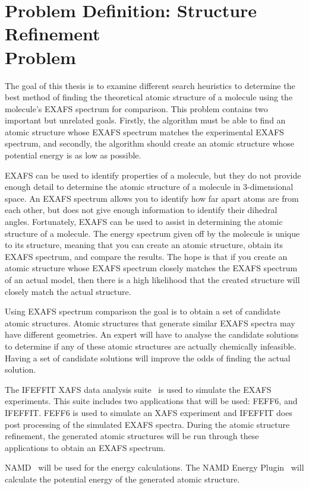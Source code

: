 \section[Problem Definition: Structure Refinement Problem]{Problem Definition: Structure Refinement\\ Problem}
\label{sec:problem-definition}

The goal of this thesis is to examine different search heuristics to determine the best method of finding the theoretical atomic structure of a molecule using the molecule's EXAFS spectrum for comparison. This problem contains two important but unrelated goals. Firstly, the algorithm must be able to find an atomic structure whose EXAFS spectrum matches the experimental EXAFS spectrum, and secondly, the algorithm should create an atomic structure whose potential energy is as low as possible.

EXAFS can be used to identify properties of a molecule, but they do not provide enough detail to determine the atomic structure of a molecule in 3-dimensional space. An EXAFS spectrum allows you to identify how far apart atoms are from each other, but does not give enough information to identify their dihedral angles. Fortunately, EXAFS can be used to assist in determining the atomic structure of a molecule. The energy spectrum given off by the molecule is unique to its structure, meaning that you can create an atomic structure, obtain its EXAFS spectrum, and compare the results. The hope is that if you create an atomic structure whose EXAFS spectrum closely matches the EXAFS spectrum of an actual model, then there is a high likelihood that the created structure will closely match the actual structure.

Using EXAFS spectrum comparison the goal is to obtain a set of candidate atomic structures. Atomic structures that generate similar EXAFS spectra may have different geometries. An expert will have to analyse the candidate solutions to determine if any of these atomic structures are actually chemically infeasible. Having a set of candidate solutions will improve the odds of finding the actual solution.

The IFEFFIT XAFS data analysis suite~\cite{ifeffit} is used to simulate the EXAFS experiments. This suite includes two applications that will be used: FEFF6, and IFEFFIT. FEFF6 is used to simulate an XAFS experiment and IFEFFIT does post processing of the simulated EXAFS spectra. During the atomic structure refinement, the generated atomic structures will be run through these applications to obtain an EXAFS spectrum.

NAMD~\cite{namd} will be used for the energy calculations. The NAMD Energy Plugin~\cite{namdEnergy}  will calculate the potential energy of the generated atomic structure.

